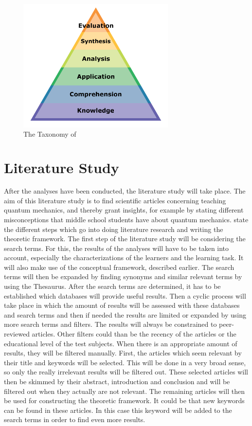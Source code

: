 \documentclass[12pt]{report} %
\begin{document}
\begin{figure}[h]
\centering
\includegraphics[width=0.7\textwidth]{bloom}
\caption{\footnotesize The Taxonomy of \protect{}\label{fig:bloom}}
\end{figure}

\section{Literature Study}

After the analyses have been conducted, the literature study will take place. The aim of this literature study is to find scientific articles concerning teaching quantum mechanics, and thereby grant insights, for example by stating different misconceptions that middle school students have about quantum mechanics.  state the different steps which go into doing literature research and writing the theoretic framework. The first step of the literature study will be considering the search terms. For this, the results of the analyses will have to be taken into account, especially the characterizations of the learners and the learning task. It will also make use of the conceptual framework, described earlier. The search terms will then be expanded by finding synonyms and similar relevant terms by using the Thesaurus. After the search terms are determined, it has to be established which databases will provide useful results. Then a cyclic process will take place in which the amount of results will be assessed with these databases and search terms and then if needed the results are limited or expanded by using more search terms and filters. The results will always be constrained to peer-reviewed articles. Other filters could than be the recency of the articles or the educational level of the test subjects. When there is an appropriate amount of results, they will be filtered manually. First, the articles which seem relevant by their title and keywords will be selected. This will be done in a very broad sense, so only the really irrelevant results will be filtered out. These selected articles will then be skimmed by their abstract, introduction and conclusion and will be filtered out when they actually are not relevant. The remaining articles will then be used for constructing the theoretic framework. It could be that new keywords can be found in these articles. In this case this keyword will be added to the search terms in order to find even more results.
\end{document}
